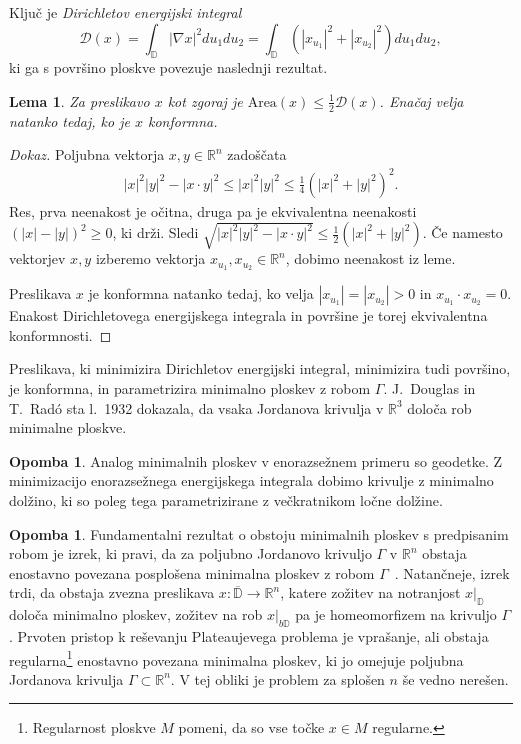 \documentclass[12pt,a4paper,twoside]{article}
\theoremstyle{definition} %
\newtheorem{opomba}[definicija]{Opomba}
\newenvironment{dokaz}[1][Dokaz]{\begin{proof}[#1]}{\end{proof}}
\theoremstyle{plain} %
\newtheorem{lema}[definicija]{Lema}
\numberwithin{equation}{section}  %
\newcommand{\R}{\mathbb R}
\begin{document}
Ključ je \emph{Dirichletov energijski integral} 
\begin{equation} \label{eq:Dirichlet-int}
\mathcal{D}(x) = \int_{\mathbb{D}} |\nabla x|^2 du_{1}du_{2} = \int_{\mathbb{D}} (|x_{u_1}|^2 + |x_{u_2}|^2) du_{1}du_{2},
\end{equation}
ki ga s površino ploskve povezuje naslednji rezultat.

\begin{lema} \label{lema:Area<=D/2}
Za preslikavo $x$ kot zgoraj je $\text{Area}(x) \leq \frac{1}{2} \mathcal{D}(x)$. Enačaj velja natanko tedaj, ko je $x$ konformna.
\end{lema}

\begin{dokaz}
Poljubna vektorja $x,y \in \mathbb{R}^{n}$ zadoščata
\begin{gather*}
|x|^2 |y|^2 - |x \cdot y|^2 \leq |x|^2 |y|^2 \leq \frac{1}{4} (|x|^2 + |y|^2)^2.
\end{gather*}
Res, prva neenakost je očitna, druga pa je ekvivalentna neenakosti $(|x|-|y|)^2 \geq 0$, ki drži.
Sledi $\sqrt{|x|^2 |y|^2 - |x \cdot y|^2} \leq \frac{1}{2} (|x|^2 + |y|^2)$. Če namesto vektorjev $x,y$ izberemo vektorja $x_{u_1}, x_{u_2} \in \mathbb{R}^{n}$, dobimo neenakost iz leme.

Preslikava $x$ je konformna natanko tedaj, ko velja $|x_{u_1}| = |x_{u_2}| > 0$ in $x_{u_1} \cdot x_{u_2} = 0$. Enakost Dirichletovega energijskega integrala in površine je torej ekvivalentna konformnosti.
\end{dokaz}

Preslikava, ki minimizira Dirichletov energijski integral, minimizira tudi površino, je konformna, in parametrizira minimalno ploskev z robom $\Gamma$.
J.~Douglas in T.~Rad\'o sta l.~1932 dokazala, da vsaka Jordanova krivulja v $\mathbb{R}^3$ določa rob minimalne ploskve.

\begin{opomba}
Analog minimalnih ploskev v enorazsežnem primeru so geodetke. Z minimizacijo enorazsežnega energijskega integrala dobimo krivulje z minimalno dolžino, ki so poleg tega parametrizirane z večkratnikom ločne dolžine. 
\end{opomba}

\begin{opomba} %
Fundamentalni rezultat o obstoju minimalnih ploskev s predpisanim robom je izrek, ki pravi, da za poljubno Jordanovo krivuljo $\Gamma$ v $\R^{n}$ obstaja enostavno povezana posplošena minimalna ploskev z robom $\Gamma$~\cite[Theorem~7.1]{osserman2002survey}. 
Natančneje, izrek trdi, da obstaja zvezna preslikava $x \colon \overline{\mathbb{D}} \to \R^{n}$, katere zožitev na notranjost $x|_{\mathbb{D}}$ določa minimalno ploskev, zožitev na rob $x|_{b\mathbb{D}}$ pa je homeomorfizem na krivuljo $\Gamma$.
\newline
Prvoten pristop k reševanju Plateaujevega problema je vprašanje, ali obstaja regularna\footnote{Regularnost ploskve $M$ pomeni, da so vse točke $x \in M$ regularne.} enostavno povezana minimalna ploskev, ki jo omejuje poljubna Jordanova krivulja $\Gamma \subset \R^{n}$. V tej obliki je problem za splošen $n$ še vedno nerešen.
\end{opomba}
\end{document}
